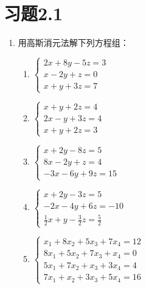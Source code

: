 \section*{习题2.1}

\begin{enumerate}
    \item 用高斯消元法解下列方程组：
\begin{multicols}{2}
\begin{enumerate}
    \item $\begin{cases}
        2x+8y-5z=3\\x-2y+z=0\\x+y+3z=7
    \end{cases}$
    \item $\begin{cases}
        x+y+2z=4\\2x-y+3z=4\\x+y+2z=3
    \end{cases}$
    \item $\begin{cases}
         x+2y-8z=5\\8x-2y+z=4\\-3x-6y+9z=15
    \end{cases}$
    \item $\begin{cases}
         x+2y-3z=5\\ -2x-4y+6z=-10\\ \frac{1}{2}x+y-\frac{3}{2}z=\frac{5}{2}
    \end{cases}$
    \item $\begin{cases}
        x_1+8x_2+5x_3+7x_4=12\\ 8x_1+5x_2+7x_3+x_4 =0\\
    5x_1+7x_2+x_3+3x_4=4\\ 7x_1+x_2+3x_3+5x_4=16
    \end{cases}$
    
\end{enumerate}    
\end{multicols}


\end{enumerate}
